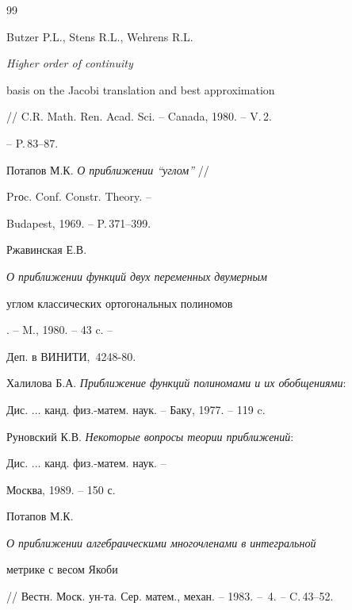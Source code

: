 \begin{thebibliography}{99}







Butzer P.L., Stens R.L., Wehrens R.L. {\em Higher order of continuity 


basis on the Jacobi translation and best approximation}


// C.R. Math. Ren. Acad. Sci. -- Canada, 1980. -- V.\,2.


-- P.\,83--87.




Потапов М.К. {\em О приближении ``углом''} // 


Prоc. Conf. Constr. Theory. --


Budapest, 1969. -- P.\,371--399.




Ржавинская Е.В. {\em О приближении функций двух переменных двумерным 


углом классических ортогональных полиномов}. -- M., 1980. -- 43 c. --


Деп. в ВИНИТИ, \No\,4248-80.




Халилова Б.А. {\em Приближение функций полиномами и их обобщениями}:


Дис. $\dotsc$ канд. физ.-матем. наук. -- Баку, 1977. -- 119 c.




Руновский К.В. {\em Некоторые вопросы теории приближений}:


Дис. $\dotsc$ канд. физ.-матем. наук. -- 


Москва, 1989. -- 150 с.




Потапов М.К. {\em О приближении алгебраическими многочленами в интегральной 


метрике с весом Якоби}


// Вестн. Моск. ун-та. Сер. матем., механ. -- 1983. -- \No\,4. -- C.\,43--52.





\end{thebibliography}





\vskip 2cm












\label{end}














